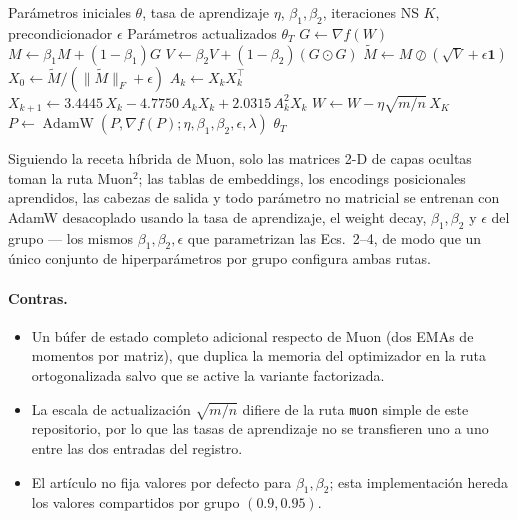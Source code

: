 \begin{algorithm}[H]
\caption{Muon² (Ortogonalización con Precondicionamiento de Segundo Momento)}
\label{alg:muon2}
\begin{algorithmic}[1]
\Require Parámetros iniciales $\theta$, tasa de aprendizaje $\eta$, $\beta_1, \beta_2$, iteraciones NS $K$, precondicionador $\epsilon$
\Ensure Parámetros actualizados $\theta_T$
        \State $G \gets \nabla f(W)$ 
        \State $M \gets \beta_1 M + (1-\beta_1) G$ 
        \State $V \gets \beta_2 V + (1-\beta_2) (G \odot G)$ 
        \State $\widetilde{M} \gets M \oslash (\sqrt{V} + \epsilon\mathbf{1})$ 
        \State $X_0 \gets \widetilde{M} / (\|\widetilde{M}\|_F + \epsilon)$ 
            \State $A_k \gets X_k X_k^\top$ 
            \State $X_{k+1} \gets 3.4445\,X_k - 4.7750\,A_k X_k + 2.0315\,A_k^2 X_k$ 
        \EndFor
        \State $W \gets W - \eta \sqrt{m/n}\, X_K$ 
    \Else
        \State $P \gets \operatorname{AdamW}(P, \nabla f(P); \eta, \beta_1, \beta_2, \epsilon, \lambda)$ 
    \EndIf
\EndFor
\Return $\theta_T$
\end{algorithmic}
\end{algorithm}

Siguiendo la receta híbrida de Muon, solo las matrices 2-D de capas ocultas toman la ruta
Muon$^2$; las tablas de embeddings, los encodings posicionales aprendidos, las cabezas de
salida y todo parámetro no matricial se entrenan con AdamW desacoplado usando la tasa de
aprendizaje, el weight decay, $\beta_1, \beta_2$ y $\epsilon$ del grupo --- los mismos
$\beta_1, \beta_2, \epsilon$ que parametrizan las Ecs.~2--4, de modo que un único conjunto
de hiperparámetros por grupo configura ambas rutas.

\paragraph{Contras.}
\begin{itemize}[leftmargin=*]
\item Un búfer de estado completo adicional respecto de Muon (dos EMAs de momentos por
matriz), que duplica la memoria del optimizador en la ruta ortogonalizada salvo que se
active la variante factorizada.
\item La escala de actualización $\sqrt{m/n}$ difiere de la ruta \texttt{muon} simple de
este repositorio, por lo que las tasas de aprendizaje no se transfieren uno a uno entre
las dos entradas del registro.
\item El artículo no fija valores por defecto para $\beta_1, \beta_2$; esta implementación
hereda los valores compartidos por grupo $(0.9, 0.95)$.
\end{itemize}

